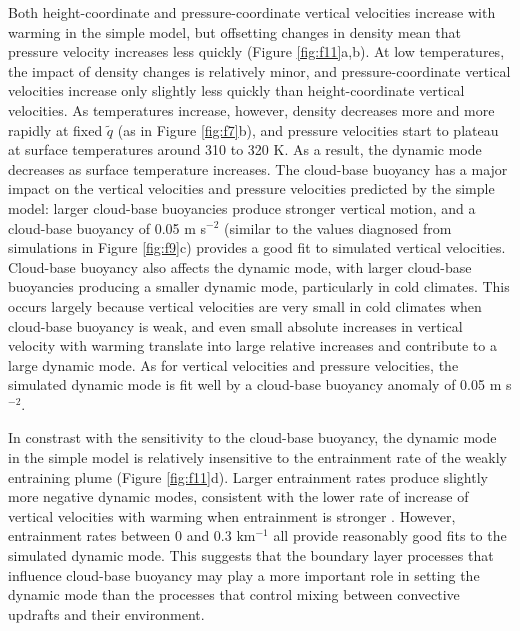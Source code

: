 \documentclass[twocol]{ametsoc}
\begin{document}
Both height-coordinate and pressure-coordinate vertical velocities increase with warming in the simple model, but offsetting changes in density mean that pressure velocity increases less quickly (Figure \ref{fig:f11}a,b). At low temperatures, the impact of density changes is relatively minor, and pressure-coordinate vertical velocities increase only slightly less quickly than height-coordinate vertical velocities. As temperatures increase, however, density decreases more and more rapidly at fixed $\tilde{q}$ (as in Figure \ref{fig:f7}b), and pressure velocities start to plateau at surface temperatures around 310 to 320 K. As a result, the dynamic mode decreases as surface temperature increases. The cloud-base buoyancy has a major impact on the vertical velocities and pressure velocities predicted by the simple model: larger cloud-base buoyancies produce stronger vertical motion, and a cloud-base buoyancy of 0.05 m s$^{-2}$ (similar to the values diagnosed from simulations in Figure \ref{fig:f9}c) provides a good fit to simulated vertical velocities. Cloud-base buoyancy also affects the dynamic mode, with larger cloud-base buoyancies producing a smaller dynamic mode, particularly in cold climates. This occurs largely because vertical velocities are very small in cold climates when cloud-base buoyancy is weak, and even small absolute increases in vertical velocity with warming translate into large relative increases and contribute to a large dynamic mode. As for vertical velocities and pressure velocities, the simulated dynamic mode is fit well by a cloud-base buoyancy anomaly of 0.05 m s$^{-2}$.

In constrast with the sensitivity to the cloud-base buoyancy, the dynamic mode in the simple model is relatively insensitive to the entrainment rate of the weakly entraining plume (Figure \ref{fig:f11}d). Larger entrainment rates produce slightly more negative dynamic modes, consistent with the lower rate of increase of vertical velocities with warming when entrainment is stronger \citep{Singh2015IncreasesEquilibrium}. However, entrainment rates between 0 and 0.3 km$^{-1}$ all provide reasonably good fits to the simulated dynamic mode. This suggests that the boundary layer processes that influence cloud-base buoyancy may play a more important role in setting the dynamic mode than the processes that control mixing between convective updrafts and their environment.
\end{document}
